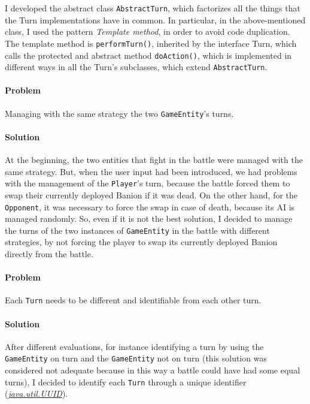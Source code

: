 \documentclass[12pt, a4paper]{report}
\theoremstyle{definition}
\begin{document}
            I developed the abstract class \verb|AbstractTurn|, which factorizes all the things that the Turn implementations have in common.
            In particular, in the above-mentioned class, I used the pattern \emph{Template method}, in order to avoid code duplication.
            The template method is \verb|performTurn()|, inherited by the interface Turn, which calls the protected and abstract 
            method \verb|doAction()|, which is implemented in different ways in all the Turn's subclasses, which extend \verb|AbstractTurn|.

            \paragraph{Problem}

            Managing with the same strategy the two \verb|GameEntity|'s turns.

            \paragraph{Solution}

            At the beginning, the two entities that fight in the battle were managed with the same strategy. But, when the user input had
            been introduced, we had problems with the management of the \verb|Player|'s turn, because the battle forced them to swap their
            currently deployed Banion if it was dead. On the other hand, for the \verb|Opponent|, it was necessary to force the swap 
            in case of death, because its AI is managed randomly. So, even if it is not the best solution, I decided to manage the turns 
            of the two instances of \verb|GameEntity| in the battle with different strategies, by not forcing the player to swap its currently 
            deployed Banion directly from the battle.

            \paragraph{Problem}

            Each \verb|Turn| needs to be different and identifiable from each other turn.

            \paragraph{Solution}

            After different evaluations, for instance identifying a turn by using the \verb|GameEntity| on turn and the \verb|GameEntity|
            not on turn (this solution was considered not adequate because in this way a battle could have had some equal turns),
            I decided to identify each \verb|Turn| through a unique identifier
            (\href{https://docs.oracle.com/en/java/javase/17/docs/api/java.base/java/util/UUID.html}{\textit{java.util.UUID}}).
\end{document}
